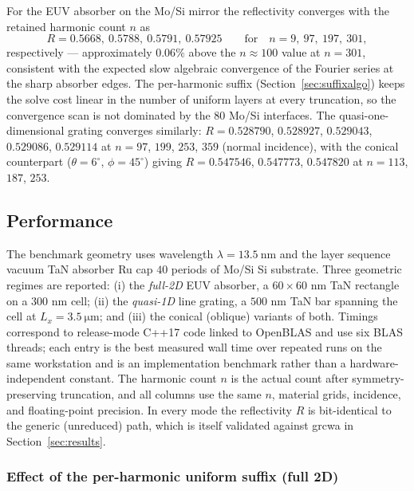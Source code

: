 \documentclass[11pt]{article}
\theoremstyle{remark}
\begin{document}
For the EUV absorber on the Mo/Si mirror the reflectivity converges with the
retained harmonic count $n$ as
\begin{equation}
R=0.5668,\ 0.5788,\ 0.5791,\ 0.57925\qquad
\text{for}\quad n=9,\ 97,\ 197,\ 301,
\end{equation}
respectively --- approximately $0.06\%$ above the $n\approx100$ value at
$n=301$, consistent with the expected slow algebraic convergence of the
Fourier series at the sharp absorber edges.  The per-harmonic suffix
(Section~\ref{sec:suffixalgo}) keeps the solve cost linear in the number of
uniform layers at every truncation, so the convergence scan is not dominated
by the $80$ Mo/Si interfaces.  The quasi-one-dimensional grating converges
similarly: $R=0.528790$, $0.528927$, $0.529043$, $0.529086$, $0.529114$ at
$n=97$, $199$, $253$, $359$ (normal incidence), with the conical counterpart
($\theta=6^\circ$, $\phi=45^\circ$) giving $R=0.547546$, $0.547773$,
$0.547820$ at $n=113$, $187$, $253$.

\subsection{Performance}

The benchmark geometry uses wavelength $\lambda=\SI{13.5}{\nano\metre}$ and the
layer sequence vacuum \textbar{} TaN absorber \textbar{} Ru cap \textbar{}
$40$ periods of Mo/Si \textbar{} Si substrate.  Three geometric regimes are
reported: (i) the \emph{full-2D} EUV absorber, a $60\times60$ nm TaN rectangle
on a $300$ nm cell; (ii) the \emph{quasi-1D} line grating, a $500$ nm TaN bar
spanning the cell at $L_x=\SI{3.5}{\micro\metre}$; and (iii) the conical
(oblique) variants of both.  Timings correspond to release-mode C++17 code
linked to OpenBLAS and use six BLAS threads; each entry is the best measured
wall time over repeated runs on the same workstation and is an implementation
benchmark rather than a hardware-independent constant.  The harmonic count $n$
is the actual count after symmetry-preserving truncation, and all columns use
the same $n$, material grids, incidence, and floating-point precision.  In
every mode the reflectivity $R$ is bit-identical to the generic (unreduced)
path, which is itself validated against grcwa in Section~\ref{sec:results}.

\subsubsection{Effect of the per-harmonic uniform suffix (full 2D)}
\end{document}
